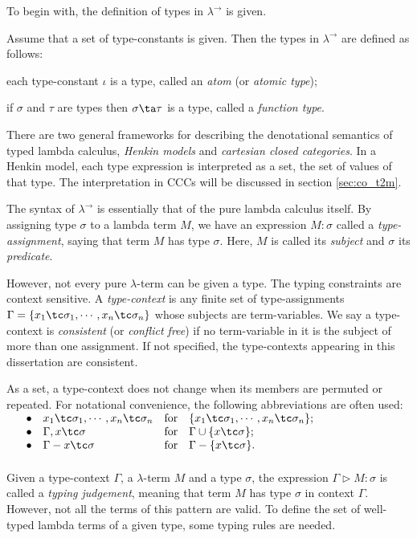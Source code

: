 To begin with, the definition of types in $ \lambda ^\to $ is given.
\begin{definition}
\label{definition:types}
Assume that a set of type-constants is given. Then the types in $ \lambda ^\to $ are defined as follows:
\begin{myitemize}
\item each type-constant $ \iota $ is a type, called an \emph{atom} (or \emph{atomic type});
\item if $ \sigma $ and $ \tau $ are types then $ \sigma \ta \tau $ is a type, called a \emph{function type}.
\end{myitemize}
\end{definition}

There are two general frameworks for describing the denotational semantics of typed lambda calculus, \emph{Henkin models} and \emph{cartesian closed categories}. In a Henkin model, each type expression is interpreted as a set, the set of values of that type. The interpretation in CCCs will be discussed in section \ref{sec:co_t2m}.

The syntax of $ \lambda ^\to $ is essentially that of the pure lambda calculus itself. By assigning type $ \sigma $ to a lambda term $ M $, we have an expression $ M : \sigma $ called a \emph{type-assignment}, saying that term $ M $ has type $ \sigma $. Here, $ M $ is called its \emph{subject} and $ \sigma $ its \emph{predicate}.

However, not every pure $ \lambda $-term can be given a type. The typing constraints are context sensitive. A \emph{type-context} is any finite set of type-assignments $ \Gamma = \{ x_1 \tc \sigma _1 , \cdots , x_n \tc \sigma _n \} $ whose subjects are term-variables. We say a type-context is \emph{consistent} (or \emph{conflict free}) if no term-variable in it is the subject of more than one assignment. If not specified, the type-contexts appearing in this dissertation are consistent.

As a set, a type-context does not change when its members are permuted or repeated. For notational convenience, the following abbreviations are often used:\\
$
\begin{array}{rlll}
\hspace*{12pt} \bullet & x_1 \tc \sigma _1 , \cdots , x_n \tc \sigma _n & \text{for} & \{ x_1 \tc \sigma _1 , \cdots , x_n \tc \sigma _n \} ; \\
\bullet & \Gamma , x \tc \sigma & \text{for} & \Gamma \cup \{ x \tc \sigma \} ; \\
\bullet & \Gamma - x \tc \sigma & \text{for} & \Gamma - \{ x \tc \sigma \} .
\end{array}
$
\\
\\
Given a type-context $ \Gamma $, a $ \lambda $-term $ M $ and a type $ \sigma $, the expression $ \Gamma \triangleright M: \sigma $ is called a \emph{typing judgement}, meaning that term $ M $ has type $ \sigma $ in context $ \Gamma $. However, not all the terms of this pattern are valid. To define the set of well-typed lambda terms of a given type, some typing rules are needed.

